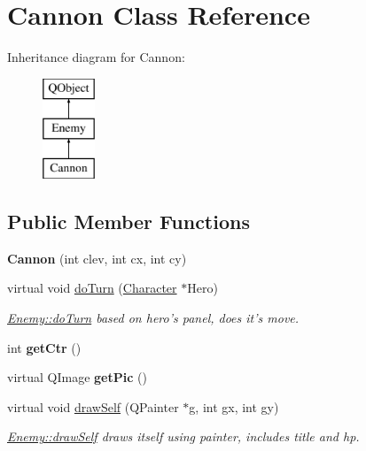 \hypertarget{class_cannon}{\section{Cannon Class Reference}
\label{class_cannon}
}
Inheritance diagram for Cannon\-:\begin{figure}[H]
\begin{center}
\leavevmode
\includegraphics[height=3.000000cm]{class_cannon}
\end{center}
\end{figure}
\subsection*{Public Member Functions}
\begin{DoxyCompactItemize}
\item 
\hypertarget{class_cannon_a167a36b440912282d8c0b44c93afd20d}{{\bfseries Cannon} (int clev, int cx, int cy)}\label{class_cannon_a167a36b440912282d8c0b44c93afd20d}

\item 
virtual void \hyperlink{class_cannon_a0ac51832424376a120add27a8b8f2759}{do\-Turn} (\hyperlink{class_character}{Character} $\ast$Hero)
\begin{DoxyCompactList}\small\item\em \hyperlink{class_enemy_a56e4b9b07e8cd2a4e5ecfa8ff5b9265a}{Enemy\-::do\-Turn} based on hero's panel, does it's move. \end{DoxyCompactList}\item 
\hypertarget{class_cannon_a38f8c0c7f785ee10df1d83c8274ce546}{int {\bfseries get\-Ctr} ()}\label{class_cannon_a38f8c0c7f785ee10df1d83c8274ce546}

\item 
\hypertarget{class_cannon_acd2aee39d3e6b40681c69d44626ce6dd}{virtual Q\-Image {\bfseries get\-Pic} ()}\label{class_cannon_acd2aee39d3e6b40681c69d44626ce6dd}

\item 
virtual void \hyperlink{class_cannon_ab3893b885bdc31461a6cacb072b223a3}{draw\-Self} (Q\-Painter $\ast$g, int gx, int gy)
\begin{DoxyCompactList}\small\item\em \hyperlink{class_enemy_a3251244e8e7ac657687d6be5a8da71bb}{Enemy\-::draw\-Self} draws itself using painter, includes title and hp. \end{DoxyCompactList}\end{DoxyCompactItemize}
